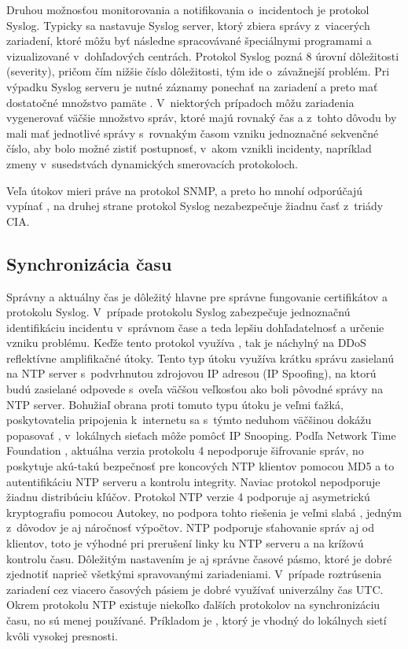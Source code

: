 Druhou možnosťou monitorovania a notifikovania o~incidentoch je protokol Syslog. Typicky sa nastavuje Syslog server, ktorý zbiera správy z~viacerých zariadení, ktoré môžu byť následne spracovávané špeciálnymi programami a vizualizované v~dohľadových centrách. Protokol Syslog pozná 8 úrovní dôležitosti (severity), pričom čím nižšie číslo dôležitosti, tým ide o~závažnejší problém. Pri výpadku Syslog serveru je nutné záznamy ponechať na zariadení a preto mať dostatočné množstvo pamäte \cite{Singh2018} \cite{uYLsMtQInofenpV3}. V~niektorých prípadoch môžu zariadenia vygenerovať väčšie množstvo správ, ktoré majú rovnaký čas a z~tohto dôvodu by mali mať jednotlivé správy s~rovnakým časom vzniku jednoznačné sekvenčné číslo, aby bolo možné zistiť postupnosť, v~akom vznikli incidenty, napríklad zmeny v~susedstvách dynamických smerovacích protokoloch.

Veľa útokov mieri práve na protokol SNMP, a preto ho mnohí odporúčajú vypínať \cite{CIS_DrTLsgXv24lxeIIM}, na druhej strane protokol Syslog nezabezpečuje žiadnu časť z~triády CIA.   


\subsection*{Synchronizácia času}
Správny a aktuálny čas je dôležitý hlavne pre správne fungovanie certifikátov a protokolu Syslog. V~prípade protokolu Syslog zabezpečuje jednoznačnú identifikáciu incidentu v~správnom čase a teda lepšiu dohľadatelnosť a určenie vzniku problému. Keďže tento protokol využíva , tak je náchylný na DDoS reflektívne amplifikačné útoky. Tento typ útoku využíva krátku správu zasielanú na NTP server s~podvrhnutou zdrojovou IP adresou (IP Spoofing), na ktorú budú zasielané odpovede s~oveľa väčšou veľkosťou ako boli pôvodné správy na NTP server. Bohužiaľ obrana proti tomuto typu útoku je veľmi ťažká, poskytovatelia pripojenia k~internetu sa s~týmto neduhom väčšinou dokážu popasovať \cite{gTkmbyKon9H6tuAm}, v~lokálnych sieťach môže pomôcť IP Snooping. Podľa Network Time Foundation \cite{s0goWNnWp5OjqREE}, aktuálna verzia protokolu 4 nepodporuje šifrovanie správ, no poskytuje akú-takú bezpečnosť pre koncových NTP klientov pomocou MD5 a to autentifikáciu NTP serveru a kontrolu integrity. Naviac protokol nepodporuje žiadnu distribúciu kľúčov. Protokol NTP verzie 4 podporuje aj asymetrickú kryptografiu pomocou Autokey, no podpora tohto riešenia je veľmi slabá \cite{s0goWNnWp5OjqREE}, jedným z~dôvodov je aj náročnosť výpočtov. NTP podporuje sťahovanie správ aj od klientov, toto je výhodné pri prerušení linky ku NTP serveru a na krížovú kontrolu času. Dôležitým nastavením je aj správne časové pásmo, ktoré je dobré zjednotiť naprieč všetkými spravovanými zariadeniami. V~prípade roztrúsenia zariadení cez viacero časových pásiem je dobré využívať univerzálny čas UTC. Okrem protokolu NTP existuje niekoľko ďalších protokolov na synchronizáciu času, no sú menej používané. Príkladom je , ktorý je vhodný do lokálnych sietí kvôli vysokej presnosti. 

